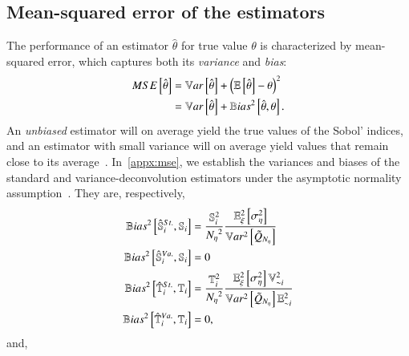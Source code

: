 \subsection{Mean-squared error of the estimators} 
The performance of an estimator $\hat{\theta}$ for true value $\theta$ is characterized by mean-squared error, which captures both its \emph{variance} and \emph{bias}:
\begin{align*}
    MSE \left[ \hat{\theta} \right] &= \mathbb{V}ar\left[\hat{\theta}\right] + \left(\mathbb{E}\left[\hat{\theta}\right] - \theta \right) ^2 \\
    &= \mathbb{V}ar\left[\hat{\theta}\right] + \mathbb{B}ias^2 \left[ \hat{\theta}, \theta \right] .
\end{align*}
An \emph{unbiased} estimator will on average yield the true values of the Sobol' indices, and an estimator with small variance will on average yield values that remain close to its average~\cite{azzini-etal-2021}.
In~\ref{appx:mse}, we establish the variances and biases of the standard and variance-deconvolution estimators under the asymptotic normality assumption~\cite{vandervaart-2000, janon-etal-2014, azzini-etal-2021}.
They are, respectively,
\begin{align} \label{eq:bias-s-stan}
    \mathbb{B}ias^2 \left[ \hat{\mathbb{S}}_{i}^{St.}, \mathbb{S}_{i} \right] &= \frac{\mathbb{S}_{i}^2}{{N_\eta}^2} \frac{\mathbb{E}_\xi ^2 \left[\sigma^2_\eta\right]}{\mathbb{V}ar^2\left[\tilde{Q}_{{N_\eta}}\right]} \\
    \mathbb{B}ias^2 \left[ \hat{\mathbb{S}}_{i}^{Va.}, \mathbb{S}_{i} \right] &= 0 \\ \label{eq:bias-t-stan}
    \mathbb{B}ias^2 \left[ \hat{\mathbb{T}}_{i}^{St.}, \mathbb{T}_{i} \right] &= \frac{\mathbb{T}_{i}^2}{{N_\eta}^2} \frac{\mathbb{E}_\xi ^2 \left[\sigma^2_\eta\right] \mathbb{V}_{{\sim i}}^2}{\mathbb{V}ar^2\left[\tilde{Q}_{{N_\eta}}\right] \mathbb{E}_{{\sim i}}^2} \\
    \mathbb{B}ias^2 \left[ \hat{\mathbb{T}}_{i}^{Va.}, \mathbb{T}_{i} \right] &= 0 ,
\end{align}
and,
